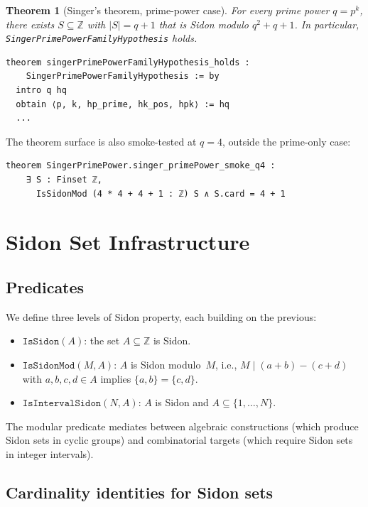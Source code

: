 \documentclass[11pt,a4paper]{article}
\newtheorem{theorem}{Theorem}[section]
\begin{document}
\begin{theorem}[Singer's theorem, prime-power case]
\label{thm:singer-prime-power}
For every prime power \(q=p^k\), there exists \(S\subseteq\mathbb{Z}\) with
\(|S|=q+1\) that is Sidon modulo \(q^2+q+1\).  In particular,
\texttt{SingerPrimePowerFamilyHypothesis} holds.
\end{theorem}

\begin{lstlisting}
theorem singerPrimePowerFamilyHypothesis_holds :
    SingerPrimePowerFamilyHypothesis := by
  intro q hq
  obtain ⟨p, k, hp_prime, hk_pos, hpk⟩ := hq
  ...
\end{lstlisting}

\noindent The theorem surface is also smoke-tested at \(q=4\), outside the
prime-only case:
\begin{lstlisting}
theorem SingerPrimePower.singer_primePower_smoke_q4 :
    ∃ S : Finset ℤ,
      IsSidonMod (4 * 4 + 4 + 1 : ℤ) S ∧ S.card = 4 + 1
\end{lstlisting}

\section{Sidon Set Infrastructure}
\label{sec:sidon-infra}

\subsection{Predicates}

We define three levels of Sidon property, each building on the previous:
\begin{itemize}[nosep]
  \item $\mathtt{IsSidon}(A)$: the set $A \subseteq \mathbb{Z}$ is Sidon.
  \item $\mathtt{IsSidonMod}(M, A)$: $A$ is Sidon modulo~$M$, i.e.,
    $M \mid (a+b)-(c+d)$ with $a,b,c,d \in A$ implies $\{a,b\}=\{c,d\}$.
  \item $\mathtt{IsIntervalSidon}(N, A)$: $A$ is Sidon and
    $A \subseteq \{1,\dots,N\}$.
\end{itemize}

The modular predicate mediates between algebraic constructions (which produce
Sidon sets in cyclic groups) and combinatorial targets (which require Sidon
sets in integer intervals).

\subsection{Cardinality identities for Sidon sets}
\end{document}
